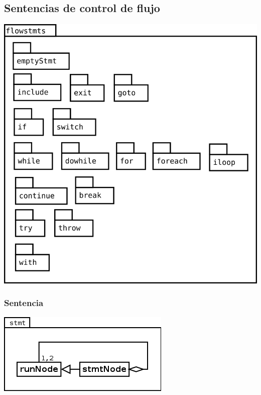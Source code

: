 \subsection{Sentencias de control de flujo}
\begin{center}
\includegraphics[scale=0.4]{flowstmts.png} \\
\end{center}

\subsubsection{Sentencia}
\begin{center}
\includegraphics[scale=0.4]{stmt.png} \\
\end{center}


